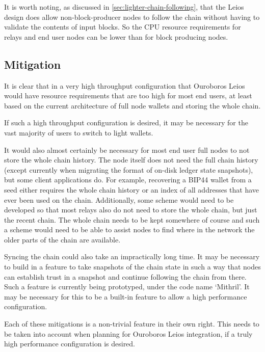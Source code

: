 \documentclass[11pt,a4paper]{article}
\begin{document}
It is worth noting, as discussed in \cref{sec:lighter-chain-following}, that
the Leios design does allow non-block-producer nodes to follow the chain
without having to validate the contents of input blocks. So the CPU resource
requirements for relays and end user nodes can be lower than for block
producing nodes.

\subsection{Mitigation}
It is clear that in a very high throughput configuration that Ouroboros Leios
would have resource requirements that are too high for most end users, at least
based on the current architecture of full node wallets and storing the whole
chain.

If such a high throughput configuration is desired, it may be necessary for the
vast majority of users to switch to light wallets.

It would also almost certainly be necessary for most end user full nodes to not
store the whole chain history. The node itself does not need the full chain
history (except currently when migrating the format of on-disk ledger state
snapshots), but some client applications do. For example, recovering a BIP44
wallet from a seed either requires the whole chain history or an index of all
addresses that have ever been used on the chain. Additionally, some scheme
would need to be developed so that most relays also do not need to store the
whole chain, but just the recent chain. The whole chain needs to be kept
somewhere of course and such a scheme would need to be able to assist nodes to
find where in the network the older parts of the chain are available.

Syncing the chain could also take an impractically long time. It may be
necessary to build in a feature to take snapshots of the chain state in such a
way that nodes can establish trust in a snapshot and continue following the
chain from there. Such a feature is currently being prototyped, under the code
name `Mithril'. It may be necessary for this to be a built-in feature to allow
a high performance configuration.

Each of these mitigations is a non-trivial feature in their own right. This
needs to be taken into account when planning for Ouroboros Leios integration,
if a truly high performance configuration is desired.
\end{document}
